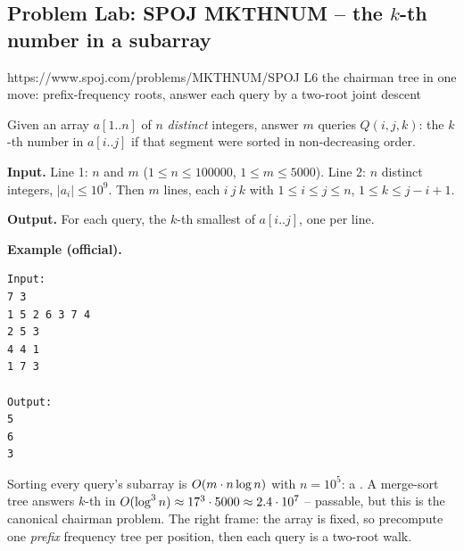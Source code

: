\subsection{Problem Lab: SPOJ MKTHNUM -- the \(k\)-th number in a subarray}

  {https://www.spoj.com/problems/MKTHNUM/}{SPOJ L6}
  {the chairman tree in one move: prefix-frequency roots, answer each query by a two-root joint descent}

\begin{problemstatement}
Given an array \(a[1..n]\) of \(n\) \emph{distinct} integers, answer \(m\) queries \(Q(i,j,k)\): the \(k\)-th number in \(a[i..j]\) if that segment were sorted in non-decreasing order.

\textbf{Input.} Line 1: \(n\) and \(m\) (\(1\le n\le 100000\), \(1\le m\le 5000\)). Line 2: \(n\) distinct integers, \(|a_i|\le 10^9\). Then \(m\) lines, each \(i\ j\ k\) with \(1\le i\le j\le n\), \(1\le k\le j-i+1\).

\textbf{Output.} For each query, the \(k\)-th smallest of \(a[i..j]\), one per line.

\textbf{Example (official).}
\begin{verbatim}
Input:
7 3
1 5 2 6 3 7 4
2 5 3
4 4 1
1 7 3

Output:
5
6
3
\end{verbatim}
\end{problemstatement}

\begin{attemptgate}
Sorting every query's subarray is \(O(m\cdot n\log n)\) with \(n=10^5\): a \tle. A merge-sort tree answers \(k\)-th in \(O(\log^3 n)\approx 17^3\cdot 5000\approx2.4\cdot10^7\) -- passable, but this is the canonical chairman problem. The right frame: the array is fixed, so precompute one \emph{prefix} frequency tree per position, then each query is a two-root walk.
\end{attemptgate}

